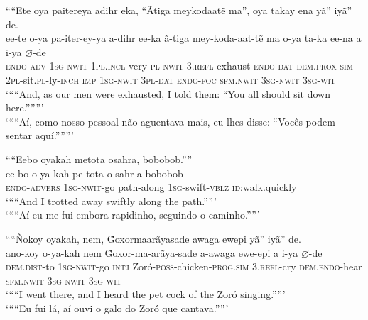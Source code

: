\documentclass[output=paper,
modfonts,nonflat
]{langsci/langscibook}
\begin{document}
\ea ““Ete oya paitereya adihr eka, “Ãtiga meykodaatẽ ma”, oya takay ena yã” iyã” de.\\[.3em]
\gll ee-te o-ya pa-iter-ey{\footnotemark}-ya a-dihr ee-ka ã-tiga mey-koda-aat-tẽ ma o-ya ta-ka ee-na a i-ya \(\varnothing\)-de\\
\textsc{endo-adv} \textsc{1sg-nwit} \textsc{1pl.incl}-very-\textsc{pl-nwit} \textsc{3.refl}-exhaust \textsc{endo-dat} \textsc{dem.prox-sim} \textsc{2pl}-sit.\textsc{pl}-ly-\textsc{inch} \textsc{imp} \textsc{1sg-nwit} \textsc{3pl-dat} \textsc{endo-foc} \textsc{sfm.nwit}  \textsc{3sg-nwit} \textsc{3sg-wit}\\
\glt ‘““And, as our men were exhausted, I told them: “You all should sit down here.”””’\\
\newpage 
\glt ‘““Aí, como nosso pessoal não aguentava mais, eu lhes disse: “Vocês podem sentar aquí.”””’\\
\z

\ea ““Eebo oyakah metota osahra, bobobob.””\\[.3em]
\gll ee-bo o-ya-kah pe-tota o-sahr-a bobobob\\
\textsc{endo-advers} \textsc{1sg-nwit}-go path-along \textsc{1sg}-swift-\textsc{vblz} \textsc{id}:walk.quickly\\
\glt ‘““And I trotted away swiftly along the path.””’\\
\glt ‘““Aí eu me fui embora rapidinho, seguindo o caminho.””’\\
\z

\ea ““Ñokoy oyakah, nem, \~{G}oxormaarãyasade awaga ewepi yã” iyã” de.\\[.3em]
\gll ano-koy o-ya-kah nem \~{G}oxor-ma-arãya-sade a-awaga ewe-epi a i-ya \(\varnothing\)-de\\
\textsc{dem.dist}-to \textsc{1sg-nwit}-go \textsc{intj} Zoró-\textsc{poss}-chicken-\textsc{prog.sim} \textsc{3.refl}-cry \textsc{dem.endo}-hear \textsc{sfm.nwit} \textsc{3sg-nwit} \textsc{3sg-wit}\\ 
\glt ‘““I went there, and I heard the pet cock of the Zoró singing.””’{\footnotemark}\\
\glt ‘““Eu fui lá, aí ouvi o galo do Zoró que cantava.””’\\
\z
\end{document}
